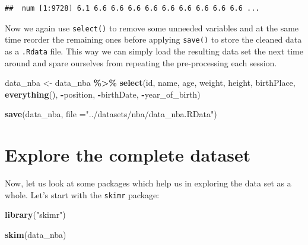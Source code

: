 \documentclass[
]{book}
\newenvironment{Shaded}{\begin{snugshade}}{\end{snugshade}}
\newcommand{\AttributeTok}[1]{\textcolor[rgb]{0.13,0.29,0.53}{#1}}
\newcommand{\FunctionTok}[1]{\textcolor[rgb]{0.13,0.29,0.53}{\textbf{#1}}}
\newcommand{\NormalTok}[1]{#1}
\newcommand{\OtherTok}[1]{\textcolor[rgb]{0.56,0.35,0.01}{#1}}
\newcommand{\SpecialCharTok}[1]{\textcolor[rgb]{0.81,0.36,0.00}{\textbf{#1}}}
\newcommand{\StringTok}[1]{\textcolor[rgb]{0.31,0.60,0.02}{#1}}
\begin{document}
\begin{verbatim}
##  num [1:9728] 6.1 6.6 6.6 6.6 6.6 6.6 6.6 6.6 6.6 6.6 ...
\end{verbatim}

Now we again use \texttt{select()} to remove some unneeded variables and at the same time reorder the remaining ones before applying \texttt{save()} to store the cleaned data as a \texttt{.Rdata} file. This way we can simply load the resulting data set the next time around and spare ourselves from repeating the pre-processing each session.

\begin{Shaded}
\begin{Highlighting}[]
\NormalTok{data\_nba }\OtherTok{\textless{}{-}}\NormalTok{ data\_nba }\SpecialCharTok{\%\textgreater{}\%}
  \FunctionTok{select}\NormalTok{(id, name, age, weight, height, birthPlace, }\FunctionTok{everything}\NormalTok{(), }\SpecialCharTok{{-}}\NormalTok{position, }\SpecialCharTok{{-}}\NormalTok{birthDate, }\SpecialCharTok{{-}}\NormalTok{year\_of\_birth)}

\FunctionTok{save}\NormalTok{(data\_nba, }\AttributeTok{file =}\StringTok{"../datasets/nba/data\_nba.RData"}\NormalTok{)}
\end{Highlighting}
\end{Shaded}

\hypertarget{explore-the-complete-dataset}{%
\section{Explore the complete dataset}\label{explore-the-complete-dataset}}

Now, let us look at some packages which help us in exploring the data set as a whole. Let's start with the \texttt{skimr} package:

\begin{Shaded}
\begin{Highlighting}[]
\FunctionTok{library}\NormalTok{(}\StringTok{"skimr"}\NormalTok{)}

\FunctionTok{skim}\NormalTok{(data\_nba)}
\end{Highlighting}
\end{Shaded}
\end{document}
